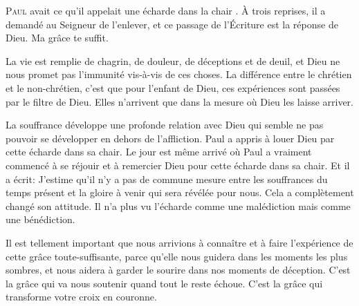 \dvrule







\lettrine{P}{aul} avait ce qu'il appelait une \Og écharde dans la chair \Fg{}.
 À trois reprises, il a demandé au Seigneur de l'enlever,
 et ce passage de l'Écriture est la réponse de Dieu.
 \Og Ma grâce te suffit. \Fg{}

La vie est remplie de chagrin, de douleur, de déceptions et de deuil,
 et Dieu ne nous promet pas l'immunité vis-à-vis de ces choses.
 La différence entre le chrétien et le non-chrétien,
 c'est que pour l'enfant de Dieu, ces expériences sont passées
 par le filtre de Dieu. Elles n'arrivent que dans la mesure
 où Dieu les laisse arriver.


La souffrance développe une profonde relation avec Dieu qui semble
 ne pas pouvoir se développer en dehors de l'affliction.
 Paul a appris à louer Dieu par cette écharde dans sa chair.
 Le jour est même arrivé où Paul a vraiment commencé à se réjouir
 et à remercier Dieu pour cette écharde dans sa chair.
 Et il a écrit: 
 \Og J'estime qu'il n'y a pas de commune mesure entre les souffrances
 du temps présent et la gloire à venir qui sera révélée pour nous. \Fg{}
 Cela a complètement changé son attitude. Il n'a plus vu l'écharde
 comme une malédiction mais comme une bénédiction.

Il est tellement important que nous arrivions à connaître
 et à faire l'expérience de cette grâce toute-suffisante,
 parce qu'elle nous guidera dans les moments les plus sombres,
 et nous aidera à garder le sourire dans nos moments de déception.
 C'est la grâce qui va nous soutenir quand tout le reste échoue.
 C'est la grâce qui transforme votre croix en couronne.

